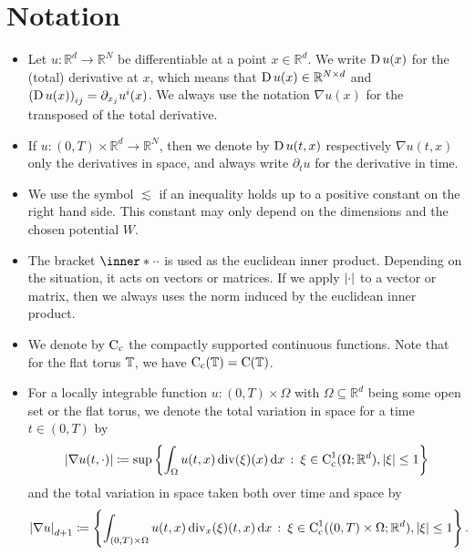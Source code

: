 \chapter{Notation}


	\begin{itemize}[leftmargin=*]
		\item	
		Let $ u \colon \mathbb{ R }^{ d } \to \mathbb{ R }^{ N } $ be 
		differentiable at a point $ x \in \mathbb{ R }^{d } $. We write $ \operatorname{D} 
		u ( x ) $ for the (total) derivative at $ x $, which means that
		$ \operatorname{D} u ( x ) \in \mathbb{ R }^{ N \times d } $ and
		$ \left( \operatorname{D} u ( x ) \right)_{ i j } = \partial_{ x_{ j } } u^{ i } ( 
		x ) $. We always use the notation $ \nabla u ( x ) $ for the transposed 
		of the total derivative. 
		
		\item
		If $ u \colon ( 0 , T ) \times \mathbb{ R }^{ d } \to \mathbb{ R 
		}^{ N } $, then we denote by $ \operatorname{D} u (t, x ) $  respectively $ \nabla 
		u ( 
		t,  x ) $ only the derivatives in space, and always write $ \partial_{ 
		t } u $ for the derivative in time.
	
		\item
		We use the symbol $ \lesssim $ if an inequality holds up to a positive 
		constant on the right hand side. This constant may only depend on the 
		dimensions and the chosen potential $ W $.
		
		\item 
		The bracket $ \inner*{\cdot}{\cdot} $ is used as the euclidean inner 
		product. Depending on the situation, it acts on vectors or matrices.
		If we apply $ \abs{ \cdot } $ to a vector or matrix, then we always 
		uses the norm induced by the euclidean inner product.
		
		\item 
		We denote by $ \operatorname{C}_{ \mathrm{c} } $ the compactly supported 
		continuous functions. Note that for the flat torus $ \operatorname{\mathbb{T}} $, we 
		have $ \operatorname{C}_{ \mathrm{c} } ( \operatorname{\mathbb{T}} ) = \operatorname{C} ( \operatorname{\mathbb{T}} ) $.
		
		\item
		For a locally integrable function $ u \colon ( 0 , T ) \times \Omega $ 
		with $ \Omega \subseteq \mathbb{ R }^{ d } $ being some open set or the 
		flat torus, we denote the total variation in space for a time $ t \in ( 
		0 , T ) $ by
		\begin{equation*}
			\abs{ \nabla u ( t , \cdot ) }
			\coloneqq
			\sup 
			\left\{
				\int_{ \Omega }
					u ( t , x ) \operatorname{div} ( \xi ) ( x ) 
				\dd{ x }
				\, \colon \,
				\xi \in \operatorname{C}_{ \mathrm{c} }^{ 1 } ( \Omega ; \mathbb{ R }^{ d 
				} ) , \abs{ \xi } \leq 1
			\right\}
		\end{equation*}	
		and the total variation in space taken both over time and space by
		\begin{equation*}
			\abs{ \nabla u }_{ d + 1 }
			\coloneqq
			\left\{
			\int_{ ( 0 , T ) \times \Omega }
			u ( t , x ) \operatorname{div}_{ x } ( \xi ) (t , x ) 
			\dd{ x }
			\, \colon \,
			\xi \in \operatorname{C}_{ \mathrm{c} }^{ 1 } (( 0 , T ) \times \Omega ; 
			\mathbb{ R }^{ d 
			} ) , \abs{ \xi } \leq 1
			\right\}.
		\end{equation*}
	\end{itemize}
